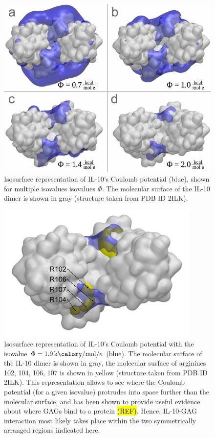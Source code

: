 \begin{figure}
\centering
\includegraphics[width=1.0\textwidth]{gfx/bspred/il10_top_coulomb_isosurfaces_different_values_03_ds.pdf}
\caption[]{
Isosurface representation of IL-10's Coulomb potential (blue), shown for
multiple isovalues isovalues $\Phi$. The molecular surface of the IL-10 dimer is
shown in gray (structure taken from PDB ID 2ILK).
}
\label{fig:bspred:il10_multi_iso}
\end{figure}


\begin{figure}
\centering
\includegraphics[width=0.9\textwidth]{gfx/bspred/SI_figure_IL-10_coulomb_isosurface_1_9kcalmol.png}
\caption[]{
Isosurface representation of IL-10's Coulomb potential with the isovalue $\Phi =
\SI{1.9}{\kilo\calory\per\mole\per\elementarycharge}$ (blue). The molecular
surface of the IL-10 dimer is shown in gray, the molecular surface of arginines
102, 104, 106, 107 is shown in yellow (structure taken from PDB ID 2ILK). This
representation allows to see where the Coulomb potential (for a given isovalue)
protrudes into space further than the molecular surface, and has been shown to
provide useful evidence about where GAGs bind to a protein \hl{(REF)}. Hence,
IL-10-GAG interaction most likely takes place within the two symmetrically
arranged regions indicated here.
}
\label{fig:bspred:il10_estatic_pred}
\end{figure}


